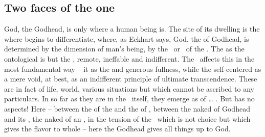 
\subsection{Two faces of the one}

\pa God, the  Godhead, is only where a human being is. The site
of its dwelling is the  where 
begins to differentiate, where, as Eckhart says,   God, the  of Godhead, is determined by the
 dimension of man's being, by the \yes\ or \No\ of the \sch.  The
 as the ontological  is but the 
, remote, ineffable and indifferent.  The \sch\ affects this
 in the most fundamental way --   it as
the  and generous fullness, while the self-centered  as
a mere void, at best, as an indifferent principle of ultimate transcendence.
These are in fact  of life, world, various situations
but  which cannot be ascribed to any particulars. In so far as they
are  in the \sch\ itself, they emerge as  of \ldots
{}. But  has no aspects! Here -- between the
 of the  and the  of ,
between the naked  of Godhead and its , the naked  of an
, in the tension of the \sch\ which is not  choice but
which gives the flavor to  whole  -- here the Godhead gives
all things up to God.



